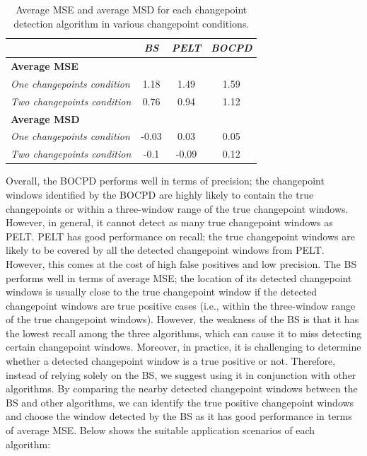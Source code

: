 \documentclass[]{interact}
\theoremstyle{plain}%
\theoremstyle{definition}
\theoremstyle{remark}
\begin{document}
    \begin{table}[H]
    	\centering
    	\renewcommand{\arraystretch}{1.2} %
    	\small
    	\caption{Average MSE and average MSD for each changepoint detection algorithm in various changepoint conditions.}
    	\begin{tabular}{lccc}
    		\hline
    		& \textit{BS} & \textit{PELT} & \textit{BOCPD} \\ \hline
    		\textbf{Average MSE}               &             &               &                \\
    		\textit{One changepoints condition} & 1.18        & 1.49          & 1.59           \\
    		\textit{Two changepoints condition} & 0.76        & 0.94          & 1.12           \\
    		\textbf{Average MSD}               &             &               &                \\
    		\textit{One changepoints condition} & -0.03       & 0.03          & 0.05           \\
    		\textit{Two changepoints condition} & -0.1        & -0.09          & 0.12          \\ \hline
    	\end{tabular}
    	\label{Avg_MSEMSD}
    \end{table}

    Overall, the BOCPD performs well in terms of precision; the changepoint windows identified by the BOCPD are highly likely to contain the true changepoints or within a three-window range of the true changepoint windows. However, in general, it cannot detect as many true changepoint windows as PELT. PELT has good performance on recall; the true changepoint windows are likely to be covered by all the detected changepoint windows from PELT. However, this comes at the cost of high false positives and low precision. The BS performs well in terms of average MSE; the location of its detected changepoint windows is usually close to the true changepoint window if the detected changepoint windows are true positive cases (i.e., within the three-window range of the true changepoint windows). However, the weakness of the BS is that it has the lowest recall among the three algorithms, which can cause it to miss detecting certain changepoint windows. Moreover, in practice, it is challenging to determine whether a detected changepoint window is a true positive or not. Therefore, instead of relying solely on the BS, we suggest using it in conjunction with other algorithms. By comparing the nearby detected changepoint windows between the BS and other algorithms, we can identify the true positive changepoint windows and choose the window detected by the BS as it has good performance in terms of average MSE. Below shows the suitable application scenarios of each algorithm:
    
\end{document}
